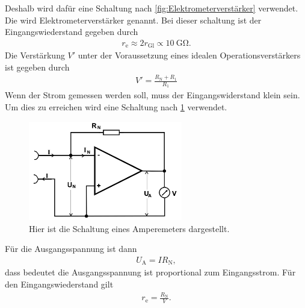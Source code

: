 Deshalb wird dafür eine Schaltung nach \cref{fig:Elektrometerverstärker} verwendet.
Die wird Elektrometerverstärker genannt.
Bei dieser schaltung ist der Eingangswiederstand gegeben durch
\begin{align}
	r_\text{e}\approx 2r_\text{Gl}\propto \SI{10}{\giga\ohm}.
\end{align}
Die Verstärkung $V'$ unter der Voraussetzung eines idealen Operationsverstärkers ist gegeben durch
\begin{align}
	V'=\frac{R_\text{N}+R_1}{R_1 }
\end{align}
Wenn der Strom gemessen werden soll, muss der Eingangswiderstand klein sein.
Um dies zu erreichen wird eine Schaltung nach \cref{fig:Amperemeter} verwendet.
\begin{figure}[h!]
	\centering
	\includegraphics[width = 0.6\textwidth]{../Grafiken/Amperemeter.png}
	\caption{Hier ist die Schaltung eines Amperemeters dargestellt. \cite{V51}\label{fig:Amperemeter}}
\end{figure}
Für die Ausgangsspannung ist dann
\begin{align}
	U_\text{A}=IR_\text{N},
\end{align}
dass bedeutet die Ausgangsspannung ist proportional zum Eingangsstrom.
Für den Eingangswiederstand gilt\\
\begin{align*}
	r_\text{e}=\frac{R_\text{N}}{V}.
\end{align*}
